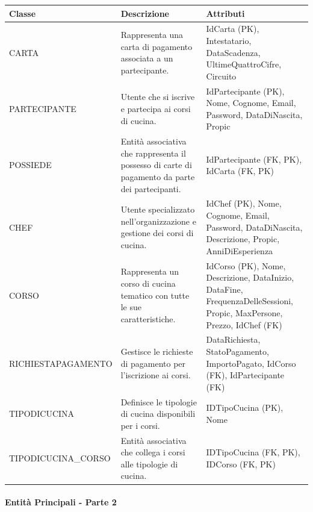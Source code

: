 \begin{center}
\begin{tcolorbox}[colback=white!98!gray, colframe=myblue!80!black, title=Dizionario delle Classi (Entità) - Parte 1, arc=4mm, boxrule=0.8pt, width=0.98\textwidth]
\renewcommand{\arraystretch}{1.2}
\begin{tabularx}{\textwidth}{p{3.2cm}p{4.8cm}X}
\textbf{Classe} & \textbf{Descrizione} & \textbf{Attributi} \\
\hline
CARTA & Rappresenta una carta di pagamento associata a un partecipante. & IdCarta (PK), Intestatario, DataScadenza, UltimeQuattroCifre, Circuito \\
\hline
PARTECI\-PANTE & Utente che si iscrive e partecipa ai corsi di cucina. & IdPartecipante (PK), Nome, Cognome, Email, Password, DataDiNascita, Propic \\
\hline
POSSIEDE & Entità associativa che rappresenta il possesso di carte di pagamento da parte dei partecipanti. & IdPartecipante (FK, PK), IdCarta (FK, PK) \\
\hline
CHEF & Utente specializzato nell'organizzazione e gestione dei corsi di cucina. & IdChef (PK), Nome, Cognome, Email, Password, DataDiNascita, Descrizione, Propic, AnniDiEsperienza \\
\hline
CORSO & Rappresenta un corso di cucina tematico con tutte le sue caratteristiche. & IdCorso (PK), Nome, Descrizione, DataInizio, DataFine, FrequenzaDelleSessioni, Propic, MaxPersone, Prezzo, IdChef (FK) \\
\hline
RICHIESTA\-PAGAMENTO & Gestisce le richieste di pagamento per l'iscrizione ai corsi. & DataRichiesta, StatoPagamento, ImportoPagato, IdCorso (FK), IdPartecipante (FK) \\
\hline
TIPODICUCINA & Definisce le tipologie di cucina disponibili per i corsi. & IDTipoCucina (PK), Nome \\
\hline
TIPODICUCINA\_\-CORSO & Entità associativa che collega i corsi alle tipologie di cucina. & IDTipoCucina (FK, PK), IDCorso (FK, PK) \\
\hline
\end{tabularx}
\end{tcolorbox}
\end{center}

\paragraph{Entità Principali - Parte 2}

